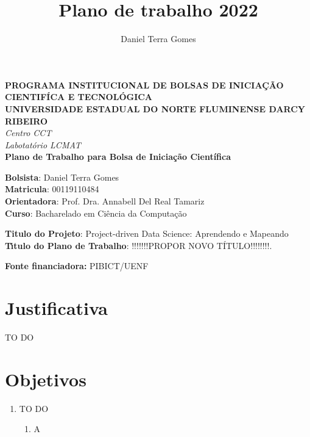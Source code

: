 \documentclass{article}
\title{Plano de trabalho 2022}
\author{Daniel Terra Gomes}
\begin{document}
\begin{titlepage}
\begin{center}
\large
\textbf{PROGRAMA INSTITUCIONAL DE BOLSAS DE INICIA\c{C}\~{A}O CIENTIF\'{I}CA E TECNOL\'{O}GICA\\\vspace{0,5cm}
UNIVERSIDADE ESTADUAL DO NORTE FLUMINENSE DARCY RIBEIRO\\
}
\textit{Centro CCT \\
Labotat\'{o}rio LCMAT\\
\vspace{1cm}}
\vspace{1,5cm}
\textbf{Plano de Trabalho para Bolsa de Iniciação Científica}\\\vspace{5cm}
\end{center}
\textbf{Bolsista}: Daniel Terra Gomes\\
\textbf{Matricula}: 00119110484\\
\textbf{Orientadora}: Prof. Dra. Annabell Del Real Tamariz  \\
\textbf{Curso}: Bacharelado em Ci\^{e}ncia da Computa\c{c}\~{a}o\\
\vspace{3cm}
\begin{center}
\textbf{Titulo do Projeto}: Project-driven Data Science: Aprendendo e Mapeando\\
\textbf{T\'{\i}tulo do Plano de Trabalho}: !!!!!!!PROPOR NOVO TÍTULO!!!!!!!!.

\textbf{Fonte financiadora:} PIBICT/UENF
\end{center}
\end{titlepage}


\section{Justificativa}

TO DO



 


\section{Objetivos}
\begin{enumerate}
    \item  TO DO
    \begin{enumerate}
        \item A
    \end{enumerate}

\end{enumerate}
\end{document}
